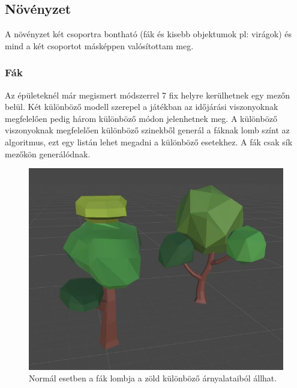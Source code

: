 \newpage
\subsection{Növényzet}

A növényzet két csoportra bontható (fák és kisebb objektumok pl: virágok) és mind a két csoportot másképpen valósítottam meg.

\subsubsection{Fák}

Az épületeknél már megismert módszerrel 7 fix helyre kerülhetnek egy mezőn belül. Két különböző modell szerepel a játékban az időjárási viszonyoknak megfelelően pedig három különböző módon jelenhetnek meg. A különböző viszonyoknak megfelelően különböző szinekből generál a fáknak lomb színt az algoritmus, ezt egy listán lehet megadni a különböző esetekhez. A fák csak sík mezőkön generálódnak.
\newline
\newline

\begin{figure}[h]
\centering
\includegraphics[scale=0.5]{kepek/img11_4_7_1.JPG}
\caption{Normál esetben a fák lombja a zöld különböző árnyalataiból állhat.}
\label{fig:img11_4_7_1}
\end{figure}

